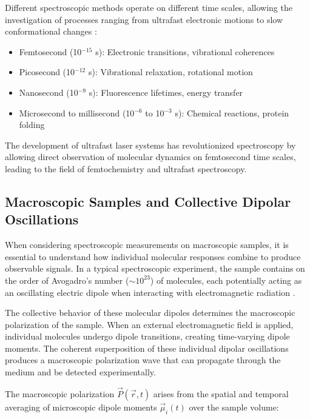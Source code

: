 \noindent Different spectroscopic methods operate on different time scales, allowing the investigation of processes ranging from ultrafast electronic motions to slow conformational changes \cite{bogaczetal2025xrayabsorptionspectroscopy, fullerogilvie2015experimentalimplementationstwodimensional}:

\begin{itemize}
	\item Femtosecond (10$^{-15}$ s): Electronic transitions, vibrational coherences
	\item Picosecond (10$^{-12}$ s): Vibrational relaxation, rotational motion
	\item Nanosecond (10$^{-9}$ s): Fluorescence lifetimes, energy transfer
	\item Microsecond to millisecond (10$^{-6}$ to 10$^{-3}$ s): Chemical reactions, protein folding
\end{itemize}

\noindent The development of ultrafast laser systems has revolutionized spectroscopy by allowing direct observation of molecular dynamics on femtosecond time scales, leading to the field of femtochemistry and ultrafast spectroscopy.

\subsection{Macroscopic Samples and Collective Dipolar Oscillations}
\label{subsec:macroscopic_samples}

\noindent When considering spectroscopic measurements on macroscopic samples, it is essential to understand how individual molecular responses combine to produce observable signals. In a typical spectroscopic experiment, the sample contains on the order of Avogadro's number ($\sim 10^{23}$) of molecules, each potentially acting as an oscillating electric dipole when interacting with electromagnetic radiation \cite{feynman1965feynmanlecturesphysics}.

\noindent The collective behavior of these molecular dipoles determines the macroscopic polarization of the sample. When an external electromagnetic field is applied, individual molecules undergo dipole transitions, creating time-varying dipole moments. The coherent superposition of these individual dipolar oscillations produces a macroscopic polarization wave that can propagate through the medium and be detected experimentally.

\noindent The macroscopic polarization $\vec{P}(\vec{r}, t)$ arises from the spatial and temporal averaging of microscopic dipole moments $\vec{\mu}_i(t)$ over the sample volume:

